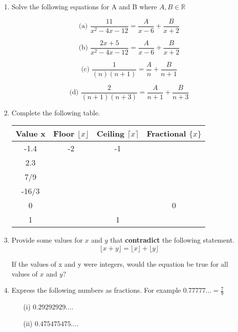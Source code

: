 \documentclass[a4paper,12pt]{article}
\begin{document}
	

\begin{enumerate}

\item 
	Solve the following equations for A and B where $A,B \in \mathbb{R}$
	\begin{multicols}{2}
	\[ \mbox{(a)     } \frac{11}{x^2 - 4x - 12} = \frac{A}{x-6} + \frac{B}{x+2}\]
	
	\[ \mbox{(b)    }\frac{2x + 5}{x^2 - 4x - 12} = \frac{A}{x-6} + \frac{B}{x+2}\]
	
	\[ \mbox{(c)     }  \frac{1}{(n)(n+1)} = \frac{A}{n} + \frac{B}{n+1}\]
	
	\[ \mbox{(d)    }\frac{2}{(n+1)(n+3)} = \frac{A}{n+1} + \frac{B}{n+3}\]
	\end{multicols}

\item 	Complete the following table.
	\begin{center}
		{ 
			\begin{tabular}{|c|c|c|c|} \hline
				Value x & Floor $\lfloor x\rfloor$ & Ceiling  $\lceil x\rceil$ & Fractional $ \{ x \} $\\ \hline
				-1.4  &	-2	&-1&	 \\ \hline
				2.3&	&		& \\ \hline
				7/9&		&		& \\ \hline 
				-16/3&		&		& \\ \hline
				0 & 	&		& 0 \\ \hline
				1 & 	&	1	& \\
				\hline
			\end{tabular} 
		}
	\end{center}
\item 
	Provide some values for $x$ and $y$ that \textbf{contradict} the following statement.
	\[ \lfloor x + y \rfloor  = \lfloor x\rfloor + \lfloor y \rfloor\]
	
	\noindent If the values of x and y were integers, would the equation be true for all values of $x$ and $y$?
	
\item Express the following numbers as fractions. For example $ 0.77777... = \frac{7}{9}$

\begin{multicols}{2}
	\begin{itemize}
		\item[(i)] $0.29292929....$
		\item[(ii)] $0.475475475....$
		

\end{itemize}
\end{multicols}
\end{enumerate}
\end{document}
